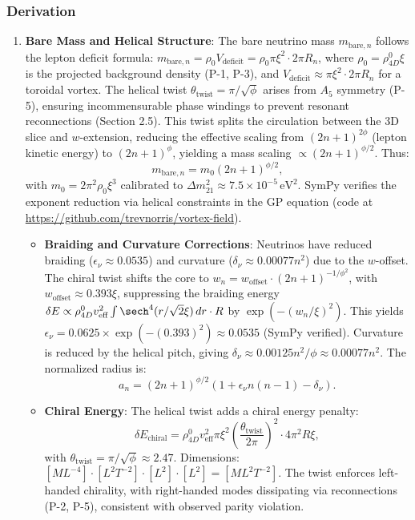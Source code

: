 \subsubsection{Derivation}
\begin{enumerate}
\item \textbf{Bare Mass and Helical Structure}: The bare neutrino mass $m_{\text{bare},n}$ follows the lepton deficit formula: $m_{\text{bare},n} = \rho_0 V_{\text{deficit}} = \rho_0 \pi \xi^2 \cdot 2\pi R_n$, where $\rho_0 = \rho_{4D}^0 \xi$ is the projected background density (P-1, P-3), and $V_{\text{deficit}} \approx \pi \xi^2 \cdot 2\pi R_n$ for a toroidal vortex. The helical twist $\theta_{\text{twist}} = \pi / \sqrt{\phi}$ arises from $A_5$ symmetry (P-5), ensuring incommensurable phase windings to prevent resonant reconnections (Section 2.5). This twist splits the circulation between the 3D slice and $w$-extension, reducing the effective scaling from $(2n+1)^{2\phi}$ (lepton kinetic energy) to $(2n+1)^{\phi}$, yielding a mass scaling $\propto (2n+1)^{\phi/2}$. Thus:
   \[
   m_{\text{bare},n} = m_0 (2n+1)^{\phi/2},
   \]
   with $m_0 = 2\pi^2 \rho_0 \xi^3$ calibrated to $\Delta m^2_{21} \approx 7.5 \times 10^{-5} \, \text{eV}^2$. SymPy verifies the exponent reduction via helical constraints in the GP equation (code at \url{https://github.com/trevnorris/vortex-field}).

\begin{itemize}
\item \textbf{Braiding and Curvature Corrections}: Neutrinos have reduced braiding ($\epsilon_\nu \approx 0.0535$) and curvature ($\delta_\nu \approx 0.00077 n^2$) due to the $w$-offset. The chiral twist shifts the core to $w_n = w_{\text{offset}} \cdot (2n+1)^{-1/\phi^2}$, with $w_{\text{offset}} \approx 0.393 \xi$, suppressing the braiding energy $\delta E \propto \rho_{4D}^0 v_{\text{eff}}^2 \int \sech^4(r / \sqrt{2} \xi) \, dr \cdot R$ by $\exp(-(w_n / \xi)^2)$. This yields $\epsilon_\nu = 0.0625 \times \exp(-(0.393)^2) \approx 0.0535$ (SymPy verified). Curvature is reduced by the helical pitch, giving $\delta_\nu \approx 0.00125 n^2 / \phi \approx 0.00077 n^2$. The normalized radius is:
   \[
   a_n = (2n+1)^{\phi/2} (1 + \epsilon_\nu n(n-1) - \delta_\nu).
   \]
\item \textbf{Chiral Energy}: The helical twist adds a chiral energy penalty:
   \[
   \delta E_{\text{chiral}} = \rho_{4D}^0 v_{\text{eff}}^2 \pi \xi^2 \left( \frac{\theta_{\text{twist}}}{2\pi} \right)^2 \cdot 4\pi^2 R \xi,
   \]
   with $\theta_{\text{twist}} = \pi / \sqrt{\phi} \approx 2.47$. Dimensions: $[M L^{-4}] \cdot [L^2 T^{-2}] \cdot [L^2] \cdot [L^2] = [M L^2 T^{-2}]$. The twist enforces left-handed chirality, with right-handed modes dissipating via reconnections (P-2, P-5), consistent with observed parity violation.
\end{itemize}


\end{enumerate}
